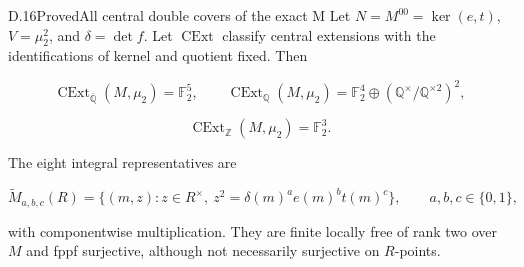 \begin{statement}{D.16}{Proved}{All central double covers of the exact M}
Let $N=M^{00}=\ker(e,t)$, $V=\mu_2^2$, and $\delta=\det f$.
Let $\operatorname{CExt}$ classify central extensions
with the identifications of kernel and quotient fixed.
Then

$$
\operatorname{CExt}_{\overline{\mathbb Q}}(M,\mu_2)=\mathbb F_2^5,
 \qquad
 \operatorname{CExt}_{\mathbb Q}(M,\mu_2)
   =\mathbb F_2^4\oplus(\mathbb Q^\times/\mathbb Q^{\times2})^2,
$$


$$
\boxed{\operatorname{CExt}_{\mathbb Z}(M,\mu_2)=\mathbb F_2^3.}
$$

The eight integral representatives are

$$
\widetilde M_{a,b,c}(R)=
 \{(m,z):z\in R^\times,\ z^2=\delta(m)^a e(m)^b t(m)^c\},
 \qquad a,b,c\in\{0,1\},
$$

with componentwise multiplication. They are finite locally
free of rank two over $M$ and fppf surjective, although
not necessarily surjective on $R$-points.
\end{statement}
